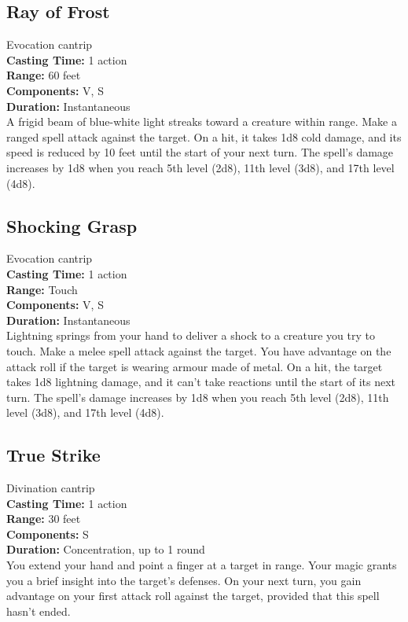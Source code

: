 \documentclass[11pt, A4paper, english]{article}
\begin{document}
		\subsection{Ray of Frost}
Evocation cantrip \\
\textbf{Casting Time:} 1 action \\
\textbf{Range:} 60 feet \\
\textbf{Components:} V, S \\
\textbf{Duration:} Instantaneous \\
A frigid beam of blue-white light streaks toward a creature within range. Make a ranged spell attack against the target. On a hit, it takes 1d8 cold damage, and its speed is reduced by 10 feet until the start of your next turn. The spell’s damage increases by 1d8 when you reach 5th level (2d8), 11th level (3d8), and 17th level (4d8).

		\subsection{Shocking Grasp}
Evocation cantrip \\
\textbf{Casting Time:} 1 action \\
\textbf{Range:} Touch \\
\textbf{Components:} V, S \\
\textbf{Duration:} Instantaneous \\
Lightning springs from your hand to deliver a shock to a creature you try to touch. Make a melee spell attack against the target. You have advantage on the attack roll if the target is wearing armour made of metal. On a hit, the target takes  1d8 lightning damage, and it can’t take reactions until the start of its next turn. The spell’s damage increases by 1d8 when you reach 5th level (2d8), 11th level (3d8), and 17th level (4d8).

		\subsection{True Strike}
Divination cantrip \\
\textbf{Casting Time:} 1 action \\
\textbf{Range:} 30 feet \\
\textbf{Components:} S \\
\textbf{Duration:} Concentration, up to 1 round \\
You extend your hand and point a finger at a target in range. Your magic grants you a brief insight into the target’s defenses. On your next turn, you gain advantage on your first attack roll against the target, provided that this spell hasn’t ended.
\end{document}

